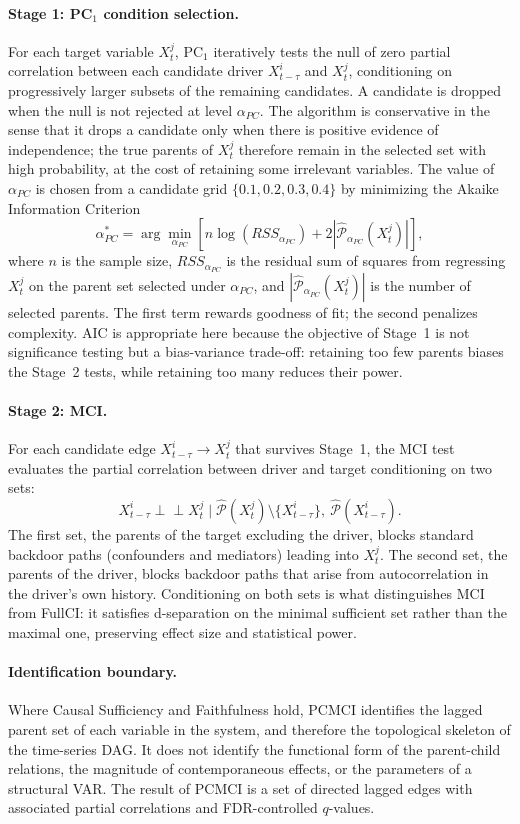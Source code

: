 \paragraph{Stage 1: PC$_1$ condition selection.}
For each target variable $X_t^j$, PC$_1$ iteratively tests the null of zero partial correlation between each candidate driver $X_{t-\tau}^i$ and $X_t^j$, conditioning on progressively larger subsets of the remaining candidates. A candidate is dropped when the null is not rejected at level $\alpha_{PC}$. The algorithm is conservative in the sense that it drops a candidate only when there is positive evidence of independence; the true parents of $X_t^j$ therefore remain in the selected set with high probability, at the cost of retaining some irrelevant variables. The value of $\alpha_{PC}$ is chosen from a candidate grid $\{0.1, 0.2, 0.3, 0.4\}$ by minimizing the Akaike Information Criterion
\[
\alpha_{PC}^* = \arg\min_{\alpha_{PC}}\left[ n \log(RSS_{\alpha_{PC}}) + 2|\hat{\mathcal{P}}_{\alpha_{PC}}(X_t^j)| \right],
\]
where $n$ is the sample size, $RSS_{\alpha_{PC}}$ is the residual sum of squares from regressing $X_t^j$ on the parent set selected under $\alpha_{PC}$, and $|\hat{\mathcal{P}}_{\alpha_{PC}}(X_t^j)|$ is the number of selected parents. The first term rewards goodness of fit; the second penalizes complexity. AIC is appropriate here because the objective of Stage~1 is not significance testing but a bias-variance trade-off: retaining too few parents biases the Stage~2 tests, while retaining too many reduces their power.

\paragraph{Stage 2: MCI.}
For each candidate edge $X_{t-\tau}^i \to X_t^j$ that survives Stage~1, the MCI test evaluates the partial correlation between driver and target conditioning on two sets:
\[
X_{t-\tau}^i \perp\!\!\!\perp X_t^j \mid \hat{\mathcal{P}}(X_t^j) \setminus \{X_{t-\tau}^i\},\ \hat{\mathcal{P}}(X_{t-\tau}^i).
\]
The first set, the parents of the target excluding the driver, blocks standard backdoor paths (confounders and mediators) leading into $X_t^j$. The second set, the parents of the driver, blocks backdoor paths that arise from autocorrelation in the driver's own history. Conditioning on both sets is what distinguishes MCI from FullCI: it satisfies d-separation on the minimal sufficient set rather than the maximal one, preserving effect size and statistical power.

\paragraph{Identification boundary.}
Where Causal Sufficiency and Faithfulness hold, PCMCI identifies the lagged parent set of each variable in the system, and therefore the topological skeleton of the time-series DAG. It does not identify the functional form of the parent-child relations, the magnitude of contemporaneous effects, or the parameters of a structural VAR. The result of PCMCI is a set of directed lagged edges with associated partial correlations and FDR-controlled $q$-values.

